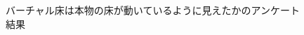 \begin{figure}[H]
    \centering
    \caption{バーチャル床は本物の床が動いているように見えたかのアンケート結果}
    \label{fig:simi}
\end{figure}


